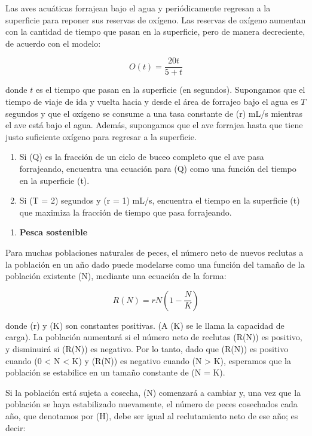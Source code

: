 \documentclass[
]{article}
\providecommand{\tightlist}{%
  \setlength{\itemsep}{0pt}\setlength{\parskip}{0pt}}\usepackage{longtable,booktabs,array}
\begin{document}
Las aves acuáticas forrajean bajo el agua y periódicamente regresan a la
superficie para reponer sus reservas de oxígeno. Las reservas de oxígeno
aumentan con la cantidad de tiempo que pasan en la superficie, pero de
manera decreciente, de acuerdo con el modelo:

\[
O(t) = \frac{20t}{5 + t}
\]

donde \(t\) es el tiempo que pasan en la superficie (en segundos).
Supongamos que el tiempo de viaje de ida y vuelta hacia y desde el área
de forrajeo bajo el agua es \(T\) segundos y que el oxígeno se consume a
una tasa constante de (r) mL/s mientras el ave está bajo el agua.
Además, supongamos que el ave forrajea hasta que tiene justo suficiente
oxígeno para regresar a la superficie.

\begin{enumerate}
\def\labelenumi{\alph{enumi}.}
\item
  Si (Q) es la fracción de un ciclo de buceo completo que el ave pasa
  forrajeando, encuentra una ecuación para (Q) como una función del
  tiempo en la superficie (t).
\item
  Si (T = 2) segundos y (r = 1) mL/s, encuentra el tiempo en la
  superficie (t) que maximiza la fracción de tiempo que pasa
  forrajeando.
\end{enumerate}

\begin{enumerate}
\def\labelenumi{\arabic{enumi}.}
\setcounter{enumi}{8}
\tightlist
\item
  \textbf{Pesca sostenible}
\end{enumerate}

Para muchas poblaciones naturales de peces, el número neto de nuevos
reclutas a la población en un año dado puede modelarse como una función
del tamaño de la población existente (N), mediante una ecuación de la
forma:

\[
R(N) = rN\left(1 - \frac{N}{K}\right)
\]

donde (r) y (K) son constantes positivas. (A (K) se le llama la
capacidad de carga). La población aumentará si el número neto de
reclutas (R(N)) es positivo, y disminuirá si (R(N)) es negativo. Por lo
tanto, dado que (R(N)) es positivo cuando (0 \textless{} N \textless{}
K) y (R(N)) es negativo cuando (N \textgreater{} K), esperamos que la
población se estabilice en un tamaño constante de (N = K).

Si la población está sujeta a cosecha, (N) comenzará a cambiar y, una
vez que la población se haya estabilizado nuevamente, el número de peces
cosechados cada año, que denotamos por (H), debe ser igual al
reclutamiento neto de ese año; es decir:
\end{document}
